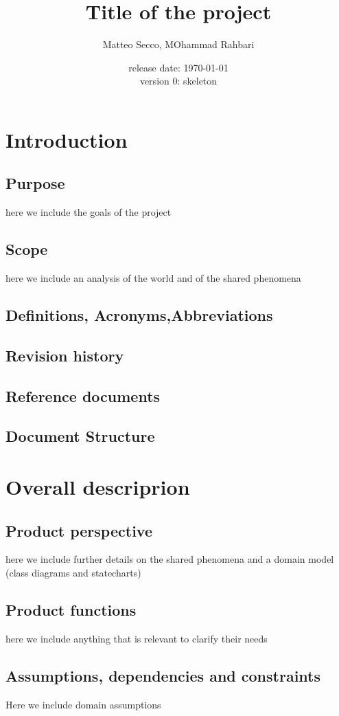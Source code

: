 \documentclass{article}
\title{Title of the project}
\date{release date: \today\\version 0: skeleton}
\author{Matteo Secco, MOhammad Rahbari}
\begin{document}
\maketitle
\newpage
\tableofcontents
\newpage
{}
\section{Introduction}
	\subsection{Purpose} here we	 include	 the	 goals of the project	
	\subsection{Scope} here we include an analysis of the world and of the shared phenomena
	\subsection{Definitions, Acronyms,Abbreviations}
	\subsection{Revision history}
	\subsection{Reference documents}
	\subsection{Document Structure}
\section{Overall descriprion}
	\subsection{Product perspective} here we include further details on the shared phenomena and a domain model (class diagrams and statecharts)
	\subsection{Product functions}here we include anything that is relevant to clarify their needs
	\subsection{Assumptions, dependencies and constraints} Here we include domain assumptions
\end{document}
